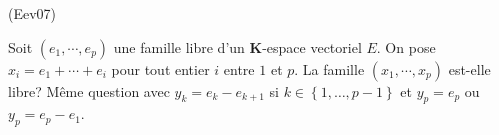 \begin{tiny}(Eev07)\end{tiny} Soit $\left( e_{1},\cdots ,e_{p}\right) $ une famille libre d'un $\mathbf{K}$-espace vectoriel $E$. On pose 
$x_{i}=e_{1}+\cdots +e_{i}$ pour tout entier $i$ entre $1$ et $p$. La famille $\left(x_{1},\cdots ,x_{p}\right)$ est-elle libre? \newline
 M{\^e}me question avec $y_{k}=e_{k}-e_{k+1}$ si $k\in \left\{ 1,\ldots ,p-1\right\} $ et $y_{p}=e_{p}$ ou $y_{p}=e_{p}-e_{1}$.
